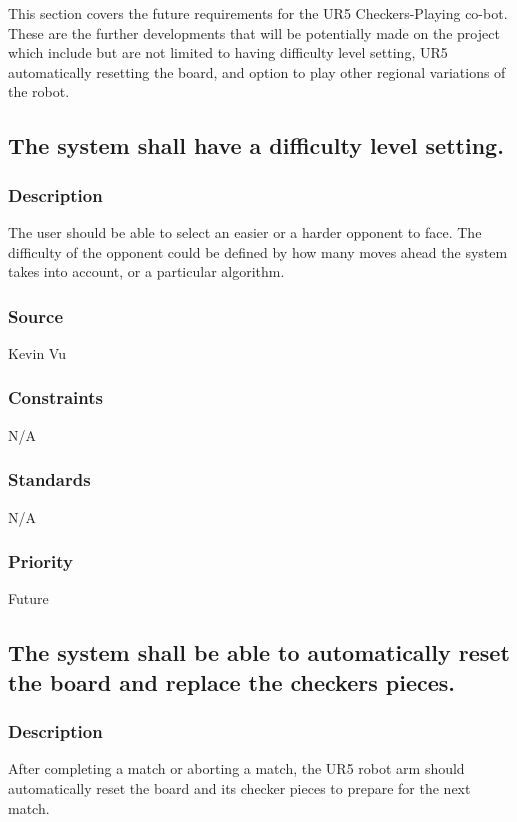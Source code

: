
This section covers the future requirements for the UR5 Checkers-Playing co-bot. These are the further developments that will be potentially made on the project which include but are not limited to having difficulty level setting, UR5 automatically resetting the board, and option to play other regional variations of the robot.

\subsection{The system shall have a difficulty level setting.}
\subsubsection{Description}
The user should be able to select an easier or a harder opponent to face. The difficulty of the opponent could be defined by how many moves ahead the system takes into account, or a particular algorithm.
\subsubsection{Source}
Kevin Vu
\subsubsection{Constraints}
N/A
\subsubsection{Standards}
N/A
\subsubsection{Priority}
Future

\subsection{The system shall be able to automatically reset the board and replace the checkers pieces.}
\subsubsection{Description}
After completing a match or aborting a match, the UR5 robot arm should automatically reset the board and its checker pieces to prepare for the next match.
